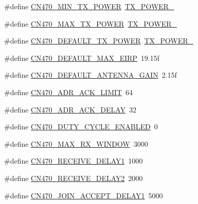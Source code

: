\begin{DoxyCompactItemize}
\item 
\#define \hyperlink{group__REGIONCN470_ga706088a08c37b56b67e88d8afa9a1db8}{C\+N470\+\_\+\+M\+I\+N\+\_\+\+T\+X\+\_\+\+P\+O\+W\+ER}~\hyperlink{group__REGION_ga3c7bd9a98f0c1e7e9aaa90857c4bd700}{T\+X\+\_\+\+P\+O\+W\+E\+R\+\_}
\item 
\#define \hyperlink{group__REGIONCN470_gae977eb62cc9b2f49770b5f0d5ec1e5df}{C\+N470\+\_\+\+M\+A\+X\+\_\+\+T\+X\+\_\+\+P\+O\+W\+ER}~\hyperlink{group__REGION_gab33618449f2a573142c463ab071ef8ed}{T\+X\+\_\+\+P\+O\+W\+E\+R\+\_}
\item 
\#define \hyperlink{group__REGIONCN470_ga0edc38df28f50fc6979f33f954a934a0}{C\+N470\+\_\+\+D\+E\+F\+A\+U\+L\+T\+\_\+\+T\+X\+\_\+\+P\+O\+W\+ER}~\hyperlink{group__REGION_gab33618449f2a573142c463ab071ef8ed}{T\+X\+\_\+\+P\+O\+W\+E\+R\+\_}
\item 
\#define \hyperlink{group__REGIONCN470_ga1b95710cffe97a036ec3a40b9c6c2dd6}{C\+N470\+\_\+\+D\+E\+F\+A\+U\+L\+T\+\_\+\+M\+A\+X\+\_\+\+E\+I\+RP}~19.\+15f
\item 
\#define \hyperlink{group__REGIONCN470_ga913d250bd6010ad63f70603ced599b87}{C\+N470\+\_\+\+D\+E\+F\+A\+U\+L\+T\+\_\+\+A\+N\+T\+E\+N\+N\+A\+\_\+\+G\+A\+IN}~2.\+15f
\item 
\#define \hyperlink{group__REGIONCN470_gab622e938b7f31be68bbab0569252cc16}{C\+N470\+\_\+\+A\+D\+R\+\_\+\+A\+C\+K\+\_\+\+L\+I\+M\+IT}~64
\item 
\#define \hyperlink{group__REGIONCN470_ga36e45d676fbedb022706448bfb3ae1ed}{C\+N470\+\_\+\+A\+D\+R\+\_\+\+A\+C\+K\+\_\+\+D\+E\+L\+AY}~32
\item 
\#define \hyperlink{group__REGIONCN470_ga02ff150057a51ba9fd56e9082a96bf0d}{C\+N470\+\_\+\+D\+U\+T\+Y\+\_\+\+C\+Y\+C\+L\+E\+\_\+\+E\+N\+A\+B\+L\+ED}~0
\item 
\#define \hyperlink{group__REGIONCN470_ga9969677259320df9c736239b84d880ff}{C\+N470\+\_\+\+M\+A\+X\+\_\+\+R\+X\+\_\+\+W\+I\+N\+D\+OW}~3000
\item 
\#define \hyperlink{group__REGIONCN470_gac402464278f79670ea353ee209878217}{C\+N470\+\_\+\+R\+E\+C\+E\+I\+V\+E\+\_\+\+D\+E\+L\+A\+Y1}~1000
\item 
\#define \hyperlink{group__REGIONCN470_ga60730d21be102b95a2393549c999930d}{C\+N470\+\_\+\+R\+E\+C\+E\+I\+V\+E\+\_\+\+D\+E\+L\+A\+Y2}~2000
\item 
\#define \hyperlink{group__REGIONCN470_ga7fa3d835986d5496a0334572a376dc01}{C\+N470\+\_\+\+J\+O\+I\+N\+\_\+\+A\+C\+C\+E\+P\+T\+\_\+\+D\+E\+L\+A\+Y1}~5000
\item 

\end{DoxyCompactItemize}
